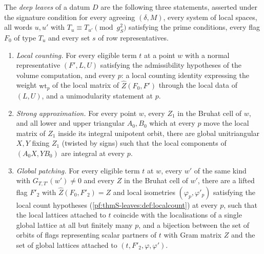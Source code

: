 \begin{definition}\label{pf:thmS-leaves:def:deep}
The \emph{deep leaves} of a datum $D$ are the following three statements, asserted under the signature condition for
every agreeing $(\delta,M)$, every system of local spaces, all words $u,u'$ with $T_u\equiv T_{u'}\pmod{g_S^2}$ satisfying the
prime conditions, every flag $F_0$ of type $T_u$ and every set $s$ of row representatives.
\begin{enumerate}[label=(D\arabic*)]
\item \emph{Local counting.} For every eligible term $t$ at a point $w$ with a normal representative $(F',L,U)$ satisfying
the admissibility hypotheses of the volume computation, and every $p$: a local counting identity expressing the weight
$\mathrm{wt}_p$ of the local matrix of $\widehat Z(F_0,F')$ through the local data of $(L,U)$, and a unimodularity statement at $p$.
\item \emph{Strong approximation.} For every point $w$, every $Z_1$ in the Bruhat cell of $w$, and all lower and upper
triangular $A_0,B_0$ which at every $p$ move the local matrix of $Z_1$ inside its integral unipotent orbit, there are global
unitriangular $X,Y$ fixing $Z_1$ (twisted by signs) such that the local components of $(A_0X,YB_0)$ are integral at every $p$.
\item \emph{Global patching.} For every eligible term $t$ at $w$, every $w'$ of the same kind with $G_{T,T'}(w')\ne0$ and every $Z$
in the Bruhat cell of $w'$, there are a lifted flag $F'_2$ with $\widehat Z(F_0,F'_2)=Z$ and local isometries
$(\varphi_p,\varphi'_p)$ satisfying the local count hypotheses (\cref{pf:thmS-leaves:def:localcount}) at every $p$, such that the
local lattices attached to $t$ coincide with the localisations of a single global lattice at all but finitely many $p$, and
a bijection between the set of orbits of flags representing scalar partners of $t$ with Gram matrix $Z$ and the set of
global lattices attached to $(t,F'_2,\varphi,\varphi')$.
\end{enumerate}
\end{definition}

